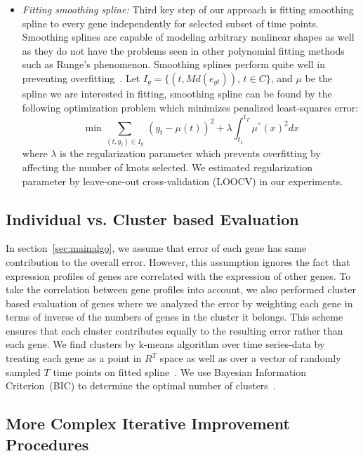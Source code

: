 \documentclass[10pt]{article}
\begin{document}
\begin{itemize}
\item {\em Fitting smoothing spline:} Third key step of our approach
  is fitting smoothing spline to every gene independently for selected
  subset of time points. Smoothing splines are capable of modeling
  arbitrary nonlinear shapes as well as they do not have the problems seen in other polynomial fitting
  methods such as Runge's phenomenon. Smoothing splines perform quite well in preventing overfitting~\cite{wahba1990}. Let
  $I_{g} = \{(t, Md(e_{gt})),\, t \in C \}$, and $\mu$ be the spline we are interested in fitting, smoothing spline
  can be found by the following optimization problem which minimizes
  penalized least-squares error:
%
\begin{equation}
\min \sum_{(t, y_{t}) \in I_{g}} \,(y_{t} - \mu(t))^{2} + \lambda
\int_{t_{1}}^{t_{T}} \mu^{''}(x)^{2} dx
\end{equation}
%
where $\lambda$ is the regularization parameter which prevents
overfitting by affecting the number of knots selected. We estimated regularization parameter by
leave-one-out cross-validation (LOOCV) in our experiments.

\end{itemize}


\subsection{Individual vs. Cluster based Evaluation}\label{sec:clusteval}

In section~\ref{sec:mainalgo}, we assume that error of each gene has
same contribution to the overall error. However, this assumption
ignores the fact that expression profiles of genes are correlated with the expression of other genes. To take the
correlation between gene profiles into account, we also performed cluster
based evaluation of genes where we analyzed the error by weighting each gene in terms of inverse of the numbers of
genes in the cluster it belongs. This scheme ensures that each cluster
contributes equally to the resulting error rather than each gene. We
find clusters by k-means algorithm over time series-data by treating each gene as a
point in $R^{T}$ space as well as over a vector of
randomly sampled $T$ time points on fitted spline~\cite{bishop2006}. We use Bayesian Information Criterion~(BIC) to
determine the optimal number of clusters~\cite{bic}.

\subsection{More Complex Iterative Improvement Procedures}\label{sec:complexiter}
\end{document}
